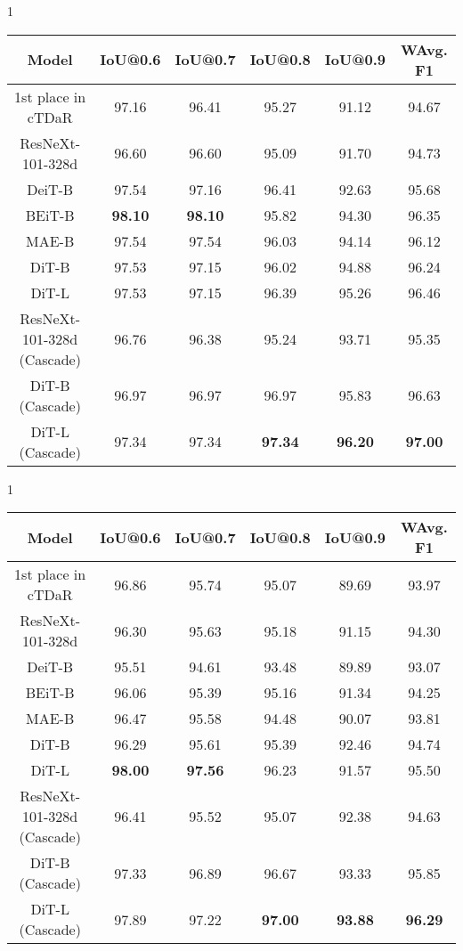 \documentclass[sigconf]{acmart}
\begin{document}
\begin{table*}[t]
\begin{subtable}[ht]{1\textwidth}
  \centering
    \begin{tabular}{cccccc}
        \toprule
        \textbf{Model} & \textbf{IoU@0.6} & \textbf{IoU@0.7} & \textbf{IoU@0.8} & \textbf{IoU@0.9} & \textbf{WAvg. F1}\\
        \midrule
        1st place in cTDaR  & 97.16  & 96.41  & 95.27  & 91.12 & 94.67 \\
        \midrule
        ResNeXt-101-328d &96.60 &96.60 &95.09 &91.70 &94.73\\
        DeiT-B &97.54	&97.16	&96.41	&92.63	&95.68\\
        BEiT-B 	& \bf 98.10		& \bf 98.10		&95.82		&94.30	&96.35\\
        MAE-B 	&97.54		&97.54		&96.03		&94.14	&96.12\\
        \midrule
        DiT-B  &97.53 &97.15  &96.02 &94.88 &96.24\\
        DiT-L  &97.53  &97.15  &96.39  &95.26 &96.46 \\
        \midrule
        ResNeXt-101-328d (Cascade)  &96.76 &96.38  &95.24 &93.71 &95.35\\
        DiT-B (Cascade)  &96.97  &96.97  &96.97  &95.83 &96.63 \\
        DiT-L (Cascade)	&97.34	&97.34	& \bf 97.34	& \bf 96.20	& \bf 97.00 \\
        \bottomrule
    \end{tabular}
    \caption{Table detection accuracy on ICDAR 2019 cTDaR (archival)}
    \label{tab:table_archival}
\end{subtable}

\begin{subtable}[ht]{1\textwidth}
    \centering
    \begin{tabular}{cccccc}
    \toprule
    \textbf{Model} & \textbf{IoU@0.6} & \textbf{IoU@0.7} & \textbf{IoU@0.8} & \textbf{IoU@0.9} & \textbf{WAvg. F1}\\
    \midrule
    1st place in cTDaR    &96.86 &95.74 &95.07  &89.69  &93.97 \\
    \midrule
    ResNeXt-101-328d &96.30 &95.63  &95.18 &91.15 &94.30\\
    DeiT-B  & 95.51  & 94.61  & 93.48  & 89.89 & 93.07 \\
    BEiT-B  & 96.06  & 95.39  & 95.16  & 91.34 & 94.25 \\
    MAE-B  & 96.47  & 95.58  & 94.48  & 90.07 & 93.81 \\
    \midrule
    DiT-B 	&96.29 	&95.61		&95.39		&92.46	&94.74  \\
    DiT-L  &\bf 98.00 &\bf 97.56 &96.23 &91.57 &95.50 \\
    \midrule
    ResNeXt-101-328d (Cascade) &96.41  &95.52 &95.07  &92.38 &94.63\\
    DiT-B (Cascade) 	&  97.33 &  96.89	&96.67	&93.33 &95.85 \\
    DiT-L (Cascade)		&97.89	&97.22	& \bf 97.00	& \bf 93.88	& \bf 96.29 \\


\end{tabular}
\end{subtable}
\end{table*}
\end{document}
